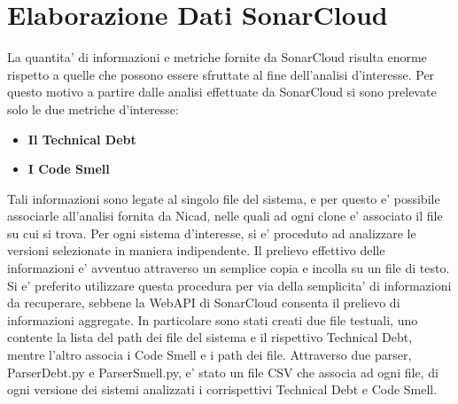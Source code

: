 \section{Elaborazione Dati SonarCloud}
La quantita' di informazioni e metriche fornite da SonarCloud risulta enorme rispetto a quelle che possono essere sfruttate al fine dell'analisi d'interesse. Per questo motivo a partire dalle analisi effettuate da SonarCloud si sono prelevate solo le due metriche d'interesse:
\begin{itemize}
	\item \textbf{Il Technical Debt} 
	\item \textbf{I Code Smell}
\end{itemize}
Tali informazioni sono legate al singolo file del sistema, e per questo e' possibile associarle all'analisi fornita da Nicad, nelle quali ad ogni clone e' associato il file su cui si trova. Per ogni sistema d'interesse, si e' proceduto ad analizzare le versioni selezionate in maniera indipendente. Il prelievo effettivo delle informazioni e' avventuo attraverso un semplice copia e incolla su un file di testo. Si e' preferito utilizzare questa procedura per via della semplicita' di informazioni da recuperare, sebbene la WebAPI di SonarCloud consenta il prelievo di informazioni aggregate.
In particolare sono stati creati due file testuali, uno contente la lista del path dei file del sistema e il rispettivo Technical Debt, mentre l'altro associa i Code Smell e i path dei file. Attraverso due parser, ParserDebt.py e ParserSmell.py, e' stato un file CSV che associa ad ogni file, di ogni versione dei sistemi analizzati i corrispettivi Technical Debt e Code Smell.